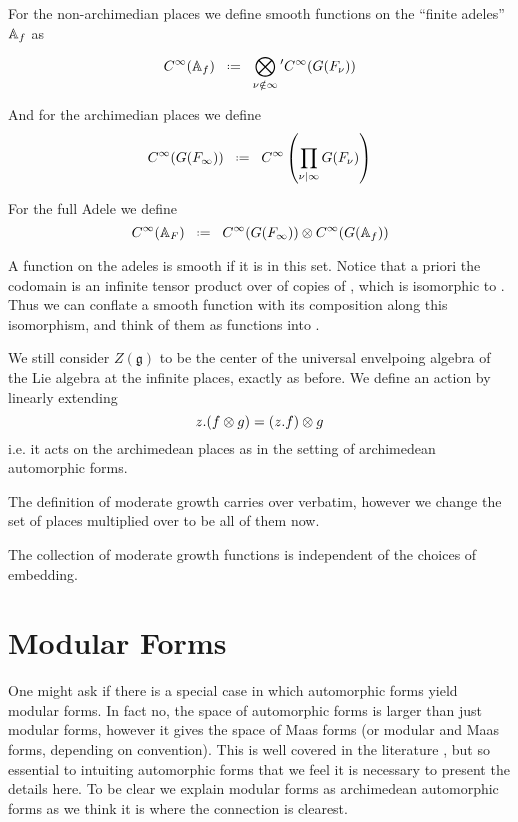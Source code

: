 	For the non-archimedian places we define smooth functions on the ``finite adeles'' \(\A_f\) as 
	\[C^\infty(\mathbb{A}_f) \defeq \bigotimes^{}_{\nu \notin \infty} \phantom{}' C^\infty(G(F_\nu)) \]
	
	And for the archimedian places we define
	\[C^\infty(G(F_\infty)) \defeq C^\infty\left(\prod_{\nu|\infty} G(F_\nu)\right)\]
	
	For the full Adele we define 
	\[C^\infty(\mathbb{A}_F) \defeq C^\infty(G(F_\infty)) \otimes C^\infty(G(\mathbb{A}_f))\]
	
	A function on the adeles is smooth if it is in this set. Notice that a priori the codomain is an infinite tensor product over \C of copies of \C, which is isomorphic to \C. Thus we can conflate a smooth function with its composition along this isomorphism, and think of them as functions into \C.

    We still consider \(Z(\mathfrak{g})\) to be the center of the universal envelpoing algebra of the Lie algebra at the infinite places, exactly as before. We define an action by linearly extending
    \[z.(f\otimes g) = (z.f)\otimes g\]
    i.e. it acts on the archimedean places as in the setting of archimedean automorphic forms. 
	
	The definition of moderate growth carries over verbatim, however we change the set of places multiplied over to be all of them now.
    
    \begin{remark}
        The collection of moderate growth functions is independent of the choices of embedding. 
    \end{remark}

\section{Modular Forms}
One might ask if there is a special case in which automorphic forms yield modular forms. In fact no, the space of automorphic forms is larger than just modular forms, however it gives the space of Maas forms (or modular and Maas forms, depending on convention). This is well covered in the literature \cite{emertonCLASSICALMODULARFORMS}\cite[3.2]{bumpAutomorphicFormsRepresentations1997}\cite{booherVIEWINGMODULARFORMS}\cite{garrettTransitionEisensteinSeries2016}, but so essential to intuiting automorphic forms that we feel it is necessary to present the details here. To be clear we explain modular forms as archimedean automorphic forms as we think it is where the connection is clearest. 

